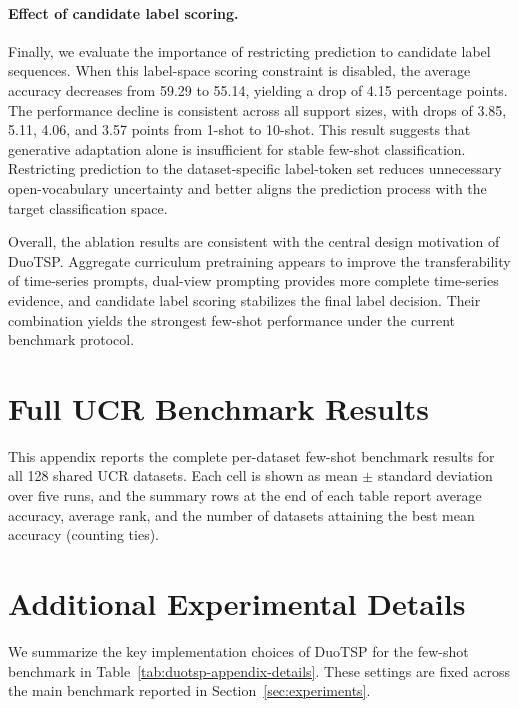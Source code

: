 \documentclass{article}
\begin{document}
\paragraph{Effect of candidate label scoring.}
Finally, we evaluate the importance of restricting prediction to candidate label sequences.
When this label-space scoring constraint is disabled, the average accuracy decreases from 59.29 to 55.14, yielding a drop of 4.15 percentage points.
The performance decline is consistent across all support sizes, with drops of 3.85, 5.11, 4.06, and 3.57 points from 1-shot to 10-shot.
This result suggests that generative adaptation alone is insufficient for stable few-shot classification.
Restricting prediction to the dataset-specific label-token set reduces unnecessary open-vocabulary uncertainty and better aligns the prediction process with the target classification space.

Overall, the ablation results are consistent with the central design motivation of DuoTSP.
Aggregate curriculum pretraining appears to improve the transferability of time-series prompts, dual-view prompting provides more complete time-series evidence, and candidate label scoring stabilizes the final label decision.
Their combination yields the strongest few-shot performance under the current benchmark protocol.




\appendix

\section{Full UCR Benchmark Results}
\label{app:full-ucr-results}
This appendix reports the complete per-dataset few-shot benchmark results for all 128 shared UCR datasets. Each cell is shown as mean $\pm$ standard deviation over five runs, and the summary rows at the end of each table report average accuracy, average rank, and the number of datasets attaining the best mean accuracy (counting ties).


\clearpage

\clearpage

\clearpage


\clearpage

\section{Additional Experimental Details}
\label{app:details}
We summarize the key implementation choices of DuoTSP for the few-shot benchmark in Table~\ref{tab:duotsp-appendix-details}. These settings are fixed across the main benchmark reported in Section~\ref{sec:experiments}.
\end{document}

